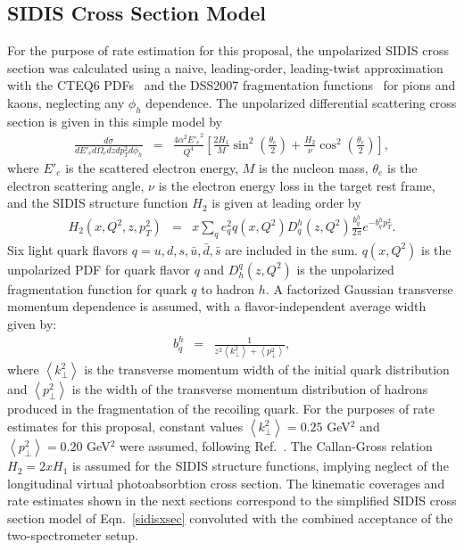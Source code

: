 \subsection{SIDIS Cross Section Model}
 For the purpose of rate estimation for this proposal, the unpolarized SIDIS cross section was calculated using a naive, leading-order, leading-twist approximation with the CTEQ6 PDFs~\cite{CTEQ6} and the DSS2007 fragmentation functions~\cite{DSS2007} for pions and kaons, neglecting any $\phi_h$ dependence. The unpolarized differential scattering cross section is given in this simple model by 
\begin{eqnarray}
  \frac{d\sigma}{dE'_e d\Omega_e dz dp_T^2 d\phi_h} &=& \frac{4\alpha^2 {E'_e}^2}{Q^4}\left[\frac{2H_1}{M} \sin^2 \left(\frac{\theta_e}{2}\right) + \frac{H_2}{\nu} \cos^2\left(\frac{\theta_e}{2}\right)\right], \label{sidisxsec}
\end{eqnarray}
where $E'_e$ is the scattered electron energy, $M$ is the nucleon mass, $\theta_e$ is the electron scattering angle, $\nu$ is the electron energy loss in the target rest frame, and the SIDIS structure function $H_2$ is given at leading order by
\begin{eqnarray}
  H_2(x, Q^2, z, p_T^2) &=& x \sum_q e_q^2 q(x,Q^2) D^h_q(z,Q^2) \frac{b_q^h}{2\pi}e^{-b_q^h p_T^2}.
\end{eqnarray}
Six light quark flavors $q = u,d,s, \bar{u}, \bar{d}, \bar{s}$ are included in the sum. $q(x,Q^2)$ is the unpolarized PDF for quark flavor $q$ and $D_h^q(z,Q^2)$ is the unpolarized fragmentation function for quark $q$ to hadron $h$. A factorized Gaussian transverse momentum dependence is assumed, with a flavor-independent average width given by:
\begin{eqnarray}
  b_q^h &=& \frac{1}{z^2\left<k^2_\perp\right> + \left<p_\perp^2 \right>}, 
\end{eqnarray}
where $\left<k^2_\perp\right>$ is the transverse momentum width of the initial quark distribution and $ \left<p_\perp^2 \right>$ is the width of the transverse momentum distribution of hadrons produced in the fragmentation of the recoiling quark. For the purposes of rate estimates for this proposal, constant values $\left<k^2_\perp\right> = 0.25$ GeV$^2$ and  $ \left<p_\perp^2 \right> = 0.20$ GeV$^2$ were assumed, following Ref.~\cite{PhysRevD.71.074006}. The Callan-Gross relation $H_2 = 2xH_1$ is assumed for the SIDIS structure functions, implying neglect of the longitudinal virtual photoabsorbtion cross section. The kinematic coverages and rate estimates shown in the next sections correspond to the simplified SIDIS cross section model of Eqn.~\eqref{sidisxsec} convoluted with the combined acceptance of the two-spectrometer setup.

